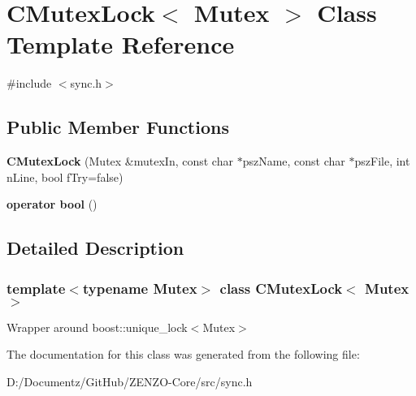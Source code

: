 \hypertarget{class_c_mutex_lock}{}\section{C\+Mutex\+Lock$<$ Mutex $>$ Class Template Reference}
\label{class_c_mutex_lock}


{\ttfamily \#include $<$sync.\+h$>$}

\subsection*{Public Member Functions}
\begin{DoxyCompactItemize}
\item 
\mbox{\label{class_c_mutex_lock_ad08e2df1cad4c5732dafb1552abe6106}} 
{\bfseries C\+Mutex\+Lock} (Mutex \&mutex\+In, const char $\ast$psz\+Name, const char $\ast$psz\+File, int n\+Line, bool f\+Try=false)
\item 
\mbox{\label{class_c_mutex_lock_a4358803c87a873252abebdd1b625d293}} 
{\bfseries operator bool} ()
\end{DoxyCompactItemize}


\subsection{Detailed Description}
\subsubsection*{template$<$typename Mutex$>$\newline
class C\+Mutex\+Lock$<$ Mutex $>$}

Wrapper around boost\+::unique\+\_\+lock$<$\+Mutex$>$ 

The documentation for this class was generated from the following file\+:\begin{DoxyCompactItemize}
\item 
D\+:/\+Documentz/\+Git\+Hub/\+Z\+E\+N\+Z\+O-\/\+Core/src/sync.\+h\end{DoxyCompactItemize}
